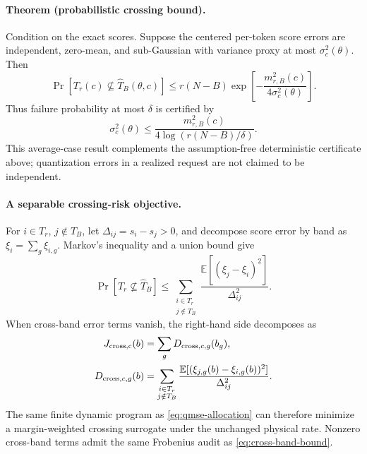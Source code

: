 \paragraph{Theorem (probabilistic crossing bound).}
Condition on the exact scores.  Suppose the centered per-token score errors
are independent, zero-mean, and sub-Gaussian with variance proxy at most
$\sigma_c^2(\theta)$.  Then
\begin{equation}
 \Pr\!\left[
  T_r(c)\not\subseteq\widehat T_B(\theta,c)
 \right]
 \le
 r(N-B)
 \exp\!\left[
  -\frac{m_{r,B}^2(c)}{4\sigma_c^2(\theta)}
 \right].
 \label{eq:crossing-probability}
\end{equation}
Thus failure probability at most $\delta$ is certified by
\begin{equation}
 \sigma_c^2(\theta)
 \le
 \frac{m_{r,B}^2(c)}
 {4\log(r(N-B)/\delta)} .
 \label{eq:crossing-subgaussian-condition}
\end{equation}
This average-case result complements the assumption-free deterministic
certificate above; quantization errors in a realized request are not claimed
to be independent.

\paragraph{A separable crossing-risk objective.}
For $i\in T_r$, $j\notin T_B$, let
$\Delta_{ij}=s_i-s_j>0$, and decompose score error by band as
$\xi_i=\sum_g\xi_{i,g}$.  Markov's inequality and a union bound give
\begin{equation}
 \Pr[T_r\not\subseteq\widehat T_B]
 \le
 \sum_{\substack{i\in T_r\\j\notin T_B}}
 \frac{\mathbb E[(\xi_j-\xi_i)^2]}{\Delta_{ij}^2}.
 \label{eq:crossing-markov-objective}
\end{equation}
When cross-band error terms vanish, the right-hand side decomposes as
\begin{align}
 J_{\rm cross,c}(b)
 &=\sum_g D_{{\rm cross},c,g}(b_g),\\
 D_{{\rm cross},c,g}(b)
 &=\sum_{\substack{i\in T_r\\j\notin T_B}}
 \frac{\mathbb E[(\xi_{j,g}(b)-\xi_{i,g}(b))^2]}
 {\Delta_{ij}^2}.
 \label{eq:crossing-band-distortion}
\end{align}
The same finite dynamic program as \cref{eq:qmse-allocation} can therefore
minimize a margin-weighted crossing surrogate under the unchanged physical
rate.  Nonzero cross-band terms admit the same Frobenius audit as
\cref{eq:cross-band-bound}.


